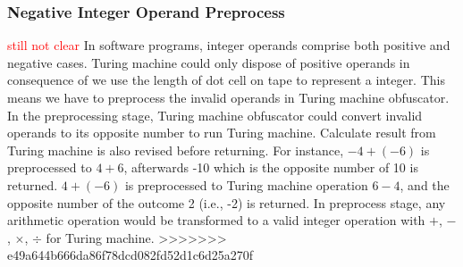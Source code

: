 \subsubsection{Negative Integer Operand Preprocess}
\textcolor{red}{still not clear}
In software programs, integer operands comprise both positive and negative
cases. Turing machine could only dispose of positive operands in consequence of
we use the length of dot cell on tape to represent a integer. This means we have
to preprocess the invalid operands in Turing machine obfuscator. In the
preprocessing stage, Turing machine obfuscator could convert invalid operands to
its opposite number to run Turing machine. Calculate result from Turing machine
is also revised before returning. For instance, $-4 + (-6)$ is preprocessed to
$4 + 6$, afterwards -10 which is the opposite number of 10 is returned. $4 +
(-6)$ is preprocessed to Turing machine operation $6 - 4$, and the opposite
number of the outcome 2 (i.e., -2) is returned. In preprocess stage, any
arithmetic operation would be transformed to a valid integer operation with $+$,
$-$, $\times$, $\div$ for Turing machine.
>>>>>>> e49a644b666da86f78dcd082fd52d1c6d25a270f
